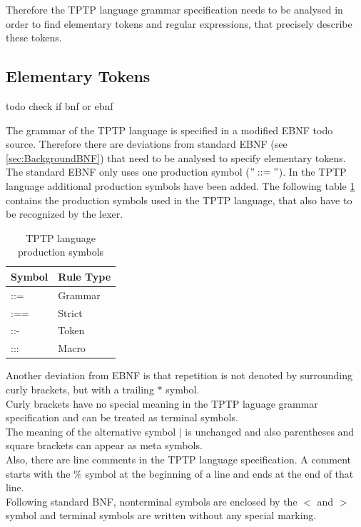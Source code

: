 Therefore the \ac{TPTP} language grammar specification needs to be analysed in order to find elementary tokens and regular expressions, that precisely describe these tokens.
\subsection{Elementary Tokens}\label{sec:ConceptElementaryTokens}
todo check if bnf or ebnf

The grammar of the \ac{TPTP} language is specified in a modified \ac{EBNF} todo source.
Therefore there are deviations from standard \ac{EBNF} (see \ref{sec:BackgroundBNF}) that need to be analysed to specify elementary tokens.
The standard \ac{EBNF} only uses one production symbol ($"::="$).
In the \ac{TPTP} language additional production symbols have been added.
The following table \ref{tbl:ConceptTPTPProductionSymbols} contains the production symbols used in the \ac{TPTP} language, that also have to be recognized by the lexer.
\begin{table}[H]
\centering
\renewcommand{\arraystretch}{1}
\caption{\ac{TPTP} language production symbols \cite{VS06}}
\begin{tabular}{ll}
\textbf{Symbol} & \textbf{Rule Type}\\\hline
::= & Grammar\\
:== & Strict\\
::- & Token\\
::: & Macro\\
\end{tabular}
\label{tbl:ConceptTPTPProductionSymbols}
\end{table}

Another deviation from \ac{EBNF} is that repetition is not denoted by surrounding curly brackets, but with a trailing $*$ symbol.\\
Curly brackets have no special meaning in the \ac{TPTP} laguage grammar specification and can be treated as terminal symbols.\\
The meaning of the alternative symbol $|$ is unchanged and also parentheses and square brackets can appear as meta symbols.\\
Also, there are line comments in the \ac{TPTP} language specification.
A comment starts with the $\%$ symbol at the beginning of a line and ends at the end of that line.\\
Following standard \ac {BNF}, nonterminal symbols are enclosed by the $<$ and $>$ symbol and terminal symbols are written without any special marking.

